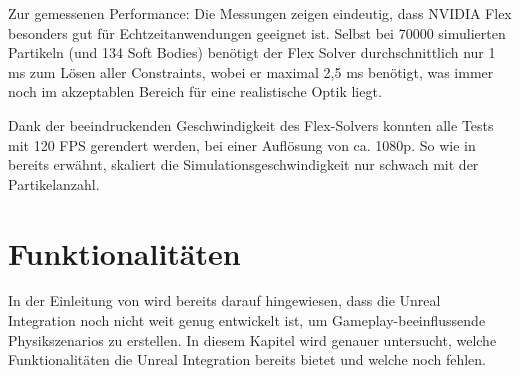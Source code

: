 Zur gemessenen Performance: 
Die Messungen zeigen eindeutig, dass NVIDIA Flex besonders gut für Echtzeitanwendungen geeignet ist. Selbst bei 70000 simulierten Partikeln (und 134 Soft Bodies) benötigt der Flex Solver durchschnittlich nur 1 ms zum Lösen aller Constraints, wobei er maximal 2,5 ms benötigt, was immer noch im akzeptablen Bereich für eine realistische Optik liegt. 



Dank der beeindruckenden Geschwindigkeit des Flex-Solvers konnten alle Tests mit 120 \ac{FPS} gerendert werden, bei einer Auflösung von ca. 1080p. 
So wie in \cite{FlexD3D} bereits erwähnt, 
skaliert die Simulationsgeschwindigkeit nur schwach mit der Partikelanzahl.





\section{Funktionalitäten}
In der Einleitung von \cite{UE4FlexDoc} wird bereits darauf hingewiesen, dass die Unreal Integration noch nicht weit genug entwickelt ist, um Gameplay-beeinflussende Physikszenarios zu erstellen. In diesem Kapitel wird genauer untersucht, welche   Funktionalitäten  die Unreal Integration bereits bietet und welche noch fehlen. 


